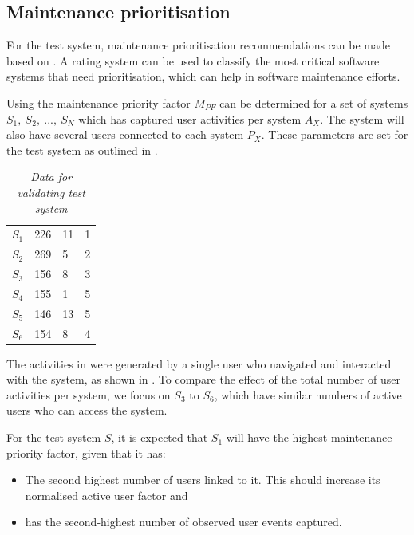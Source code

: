 \subsection{Maintenance prioritisation}
For the test system, maintenance prioritisation recommendations can be made based on . A rating system can be used to classify the most critical software systems that need prioritisation, which can help in software maintenance efforts. \par Using  the maintenance priority factor $M_{PF}$ can be determined for a set of systems {$S_1,~S_2,~...,~S_N$} which has captured user activities per system $A_X$. The system will also have several users connected to each system $P_X$. These parameters are set for the test system as outlined in .

\begin{table}[!htb]
	\centering
	\caption[Data for validating test system]
	{\textit{Data for validating test system}}
	\label{tbl:ch3_testData}
	\begin{tabularx}{\textwidth}{XXXX}
		\toprule
		\thead{System ($S_X$)} & \thead{Users per system ($P_X$)} & \thead{Number of events ($A_X$)} & \thead{Expected priority} \\
		\midrule
		\rowcolor{lightgray}
		$S_1$ & 226 & 11 & 1 \\
		$S_2$ & 269 & 5 & 2 \\
		\rowcolor{lightgray}
		$S_3$ & 156 & 8 & 3 \\
		$S_4$ & 155 & 1 & 5 \\
		\rowcolor{lightgray}
		$S_5$ & 146 & 13 & 5 \\
		$S_6$ & 154 & 8 & 4 \\
		\bottomrule
	\end{tabularx}
\end{table}

The activities in  were generated by a single user who navigated and interacted with the system, as shown in . To compare the effect of the total number of user activities per system, we focus on $S_3$ to $S_6$, which have similar numbers of active users who can access the system.\par For the test system $S$, it is expected that $S_1$ will have the highest maintenance priority factor, given that it has:

\begin{itemize}
	\item The second highest number of users linked to it. This should increase its normalised active user factor and
	\item has the second-highest number of observed user events captured.
\end{itemize}

